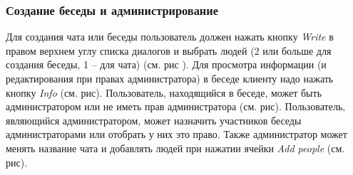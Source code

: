 \documentclass[a4paper,12pt]{article}
\begin{document}
	\subsubsection{Создание беседы и администрирование}
	Для создания чата или беседы пользователь должен нажать кнопку \textit{Write} в правом верхнем углу списка диалогов и выбрать людей (2 или больше для создания беседы, 1 -- для чата) (см. рис ). Для просмотра информации (и редактирования при правах администратора) в беседе клиенту надо нажать кнопку \textit{Info} (см. рис). Пользователь, находящийся в беседе, может быть администратором или не иметь прав администратора (см. рис). Пользователь, являющийся администратором, может назначить участников беседы администраторами или отобрать у них это право. Также администратор может менять название чата и добавлять людей при нажатии ячейки \textit{Add people} (см. рис).
\end{document}
